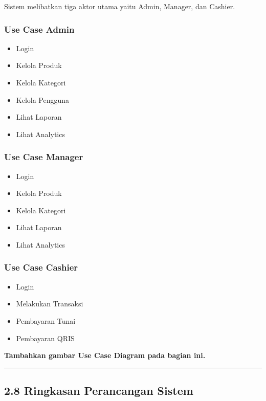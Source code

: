 Sistem melibatkan tiga aktor utama yaitu Admin, Manager, dan Cashier.

\subsubsection{Use Case Admin}\label{use-case-admin}

\begin{itemize}
\tightlist
\item
  Login
\item
  Kelola Produk
\item
  Kelola Kategori
\item
  Kelola Pengguna
\item
  Lihat Laporan
\item
  Lihat Analytics
\end{itemize}

\subsubsection{Use Case Manager}\label{use-case-manager}

\begin{itemize}
\tightlist
\item
  Login
\item
  Kelola Produk
\item
  Kelola Kategori
\item
  Lihat Laporan
\item
  Lihat Analytics
\end{itemize}

\subsubsection{Use Case Cashier}\label{use-case-cashier}

\begin{itemize}
\tightlist
\item
  Login
\item
  Melakukan Transaksi
\item
  Pembayaran Tunai
\item
  Pembayaran QRIS
\end{itemize}

\textbf{Tambahkan gambar Use Case Diagram pada bagian ini.}

\begin{center}\rule{0.5\linewidth}{0.5pt}\end{center}

\subsection{2.8 Ringkasan Perancangan Sistem}\label{ringkasan-perancangan-sistem}

